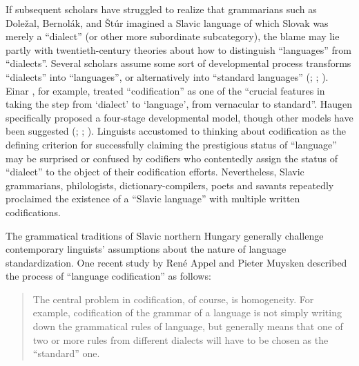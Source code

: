 If subsequent scholars have struggled to realize that grammarians such as Doležal, Bernolák, and Štúr imagined a Slavic language of which Slovak was merely a “dialect” (or other more subordinate subcategory), the blame may lie partly with twentieth-century theories about how to distinguish “languages” \linebreak{}from “dialects”. Several scholars assume some sort of developmental process \linebreak{} transforms “dialects” into “languages”, or alternatively into “standard languages” (\cite{lodge_french_1993}; \cite{nielsen_dialect_2005}; \cite[13--34]{van_marle_dialect_2014}). Einar \citet[933]{haugen_dialect_1966}, for example, treated “codification” as one of the “crucial features in taking the step from ‘dialect’ to ‘language’, from vernacular to standard”. Haugen specifically proposed a four-stage developmental model, though other models have been suggested (\cite[28--33]{ferguson_language_1968}; \cite{hroch_social_1994}; \citeyear[67--96]{hroch_comparative_2007}). Linguists accustomed to thinking about codification as the defining criterion for successfully claiming the prestigious status of “language” may be surprised or confused by codifiers who contentedly assign the status of “dialect” to the object of their codification efforts. Nevertheless, Slavic grammarians, philologists, dictionary-compilers, poets and savants repeatedly proclaimed the existence of a “Slavic language” with multiple written codifications.

The grammatical traditions of Slavic northern Hungary generally challenge contemporary linguists’ assumptions about the nature of language standardization. One recent study by René Appel and Pieter Muysken described the process of “language codification” as follows:

\begin{quote}
    The central problem in codification, of course, is homogeneity. For example, codification of the grammar of a language is not simply writing down the grammatical rules of language, but generally means that one of two or more rules from different dialects will have to be chosen as the “standard” one. \citep[51--52]{appel_language_1987}
\end{quote}

